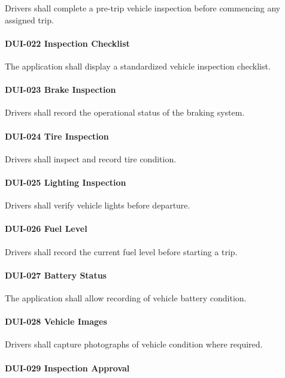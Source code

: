 Drivers shall complete a pre-trip vehicle inspection before commencing
any assigned trip.

\paragraph{DUI-022 Inspection Checklist}

The application shall display a standardized vehicle inspection
checklist.

\paragraph{DUI-023 Brake Inspection}

Drivers shall record the operational status of the braking system.

\paragraph{DUI-024 Tire Inspection}

Drivers shall inspect and record tire condition.

\paragraph{DUI-025 Lighting Inspection}

Drivers shall verify vehicle lights before departure.

\paragraph{DUI-026 Fuel Level}

Drivers shall record the current fuel level before starting a trip.

\paragraph{DUI-027 Battery Status}

The application shall allow recording of vehicle battery condition.

\paragraph{DUI-028 Vehicle Images}

Drivers shall capture photographs of vehicle condition where required.

\paragraph{DUI-029 Inspection Approval}

